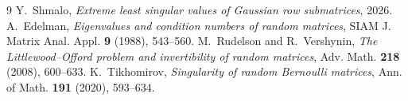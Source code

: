 \documentclass[11pt,reqno]{amsart}
\theoremstyle{plain}
\theoremstyle{definition}
\theoremstyle{remark}
\begin{document}
\begin{thebibliography}{9}
 Y.~Shmalo, \emph{Extreme least singular values of Gaussian row submatrices}, 2026.
 A.~Edelman, \emph{Eigenvalues and condition numbers of random matrices}, SIAM J.
  Matrix Anal. Appl. \textbf{9} (1988), 543--560.
 M.~Rudelson and R.~Vershynin, \emph{The Littlewood--Offord problem and invertibility of
  random matrices}, Adv. Math. \textbf{218} (2008), 600--633.
 K.~Tikhomirov, \emph{Singularity of random Bernoulli matrices}, Ann. of Math.
  \textbf{191} (2020), 593--634.
\end{thebibliography}
\end{document}
